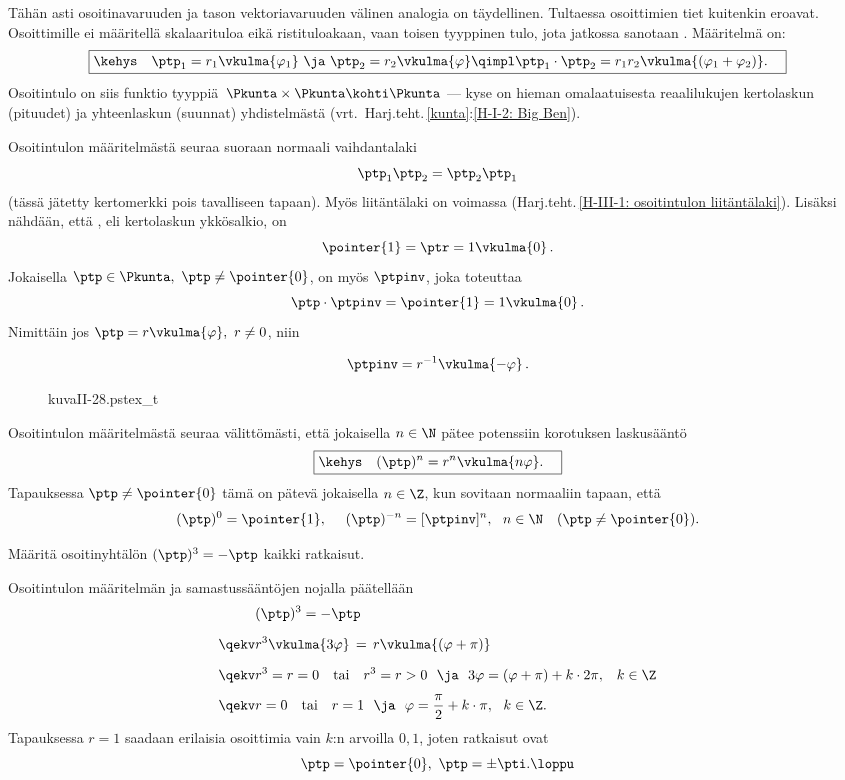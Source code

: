 Tähän asti osoitinavaruuden ja tason vektoriavaruuden välinen analogia on täydellinen.
Tultaessa osoittimien  tiet kuitenkin eroavat. Osoittimille ei määritellä
skalaarituloa eikä ristituloakaan, vaan toisen tyyppinen tulo, jota jatkossa sanotaan
%
. Määritelmä on:
\[
\boxed{\kehys\quad \ptp_1 = r_1 \vkulma{\varphi_1} \ \ja \ \ptp_2 = r_2 \vkulma{\varphi} \qimpl 
                 \ptp_1\cdot\ptp_2 = r_1 r_2 \vkulma{(\varphi_1 + \varphi_2)}. \quad}
\]
Osoitintulo on siis funktio tyyppiä $\,\Pkunta \times \Pkunta \kohti \Pkunta$ --- kyse on
hieman omalaatuisesta reaalilukujen kertolaskun (pituudet) ja yhteenlaskun (suunnat)
yhdistelmästä (vrt.\ Harj.teht.\,\ref{kunta}:\ref{H-I-2: Big Ben}).

Osoitintulon määritelmästä seuraa suoraan normaali vaihdantalaki
\[
\ptp_1\ptp_2 = \ptp_2\ptp_1
\]
(tässä jätetty kertomerkki pois tavalliseen tapaan). Myös liitäntälaki on voimassa
(Harj.teht.\,\ref{H-III-1: osoitintulon liitäntälaki}). Lisäksi nähdään, että
%
, eli kertolaskun ykkösalkio, on
\[
\pointer{1} = \ptr = 1 \vkulma{0}\,.
\]
Jokaisella $\ptp \in \Pkunta, \ \ptp \neq \pointer{0}$, on myös
%
 $\ptpinv$, joka toteuttaa
\[
\ptp\cdot\ptpinv = \pointer{1} = 1 \vkulma{0}\,.
\]
Nimittäin jos $\ptp = r \vkulma{\varphi},\ r \neq 0$, niin 
\begin{multicols}{2} \raggedcolumns
\[
\ptpinv = r^{-1}\vkulma{-\varphi}\,.
\]
\begin{figure}[H]
{kuvaII-28.pstex_t}
\end{figure}
\end{multicols}
Osoitintulon määritelmästä seuraa välittömästi, että jokaisella $n\in\N$ pätee potenssiin 
korotuksen laskusääntö
\[
\boxed{\kehys\quad (\ptp)^n = r^n\vkulma{n\varphi}. \quad}
\]
Tapauksessa $\ptp\neq\pointer{0}$ tämä on pätevä jokaisella $n\in\Z$, kun sovitaan normaaliin 
tapaan, että
\[
(\ptp)^0=\pointer{1}, \quad\ (\ptp)^{-n}=[\ptpinv]^n,\ \ n\in\N \quad (\ptp\neq\pointer{0}).
\]
\begin{Exa} Määritä osoitinyhtälön $(\ptp)^3=-\ptp$ kaikki ratkaisut.
\end{Exa}
\ratk Osoitintulon määritelmän ja samastussääntöjen nojalla päätellään
\begin{align*}
      &(\ptp)^3=-\ptp \\[2mm]
\qekv &r^3\vkulma{3\varphi} \,=\, r\vkulma{(\varphi+\pi)} \\[2mm]
\qekv &r^3=r=0 \quad \text{tai} \quad 
       r^3=r>0\ \ \ja\ \ 3\varphi=(\varphi+\pi)+k \cdot 2\pi,\,\ \ k\in\Z \\[1mm]
\qekv &r=0 \quad \text{tai} \quad r=1\ \ \ja\ \ \varphi=\frac{\pi}{2}+k\cdot\pi,\ \ k\in\Z.
\end{align*}
Tapauksessa $r=1$ saadaan erilaisia osoittimia vain $k$:n arvoilla $0,1$, joten ratkaisut
ovat
\[
\ptp=\pointer{0},\ \ptp=\pm\pti. \loppu
\]

